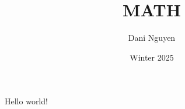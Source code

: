 \documentclass[12pt, letterpaper]{article}
\title{MATH }
\author{Dani Nguyen}
\date{Winter 2025}
\begin{document}
\maketitle
\tableofcontents

\section{}
\subsection{}
Hello world!
\end{document}
